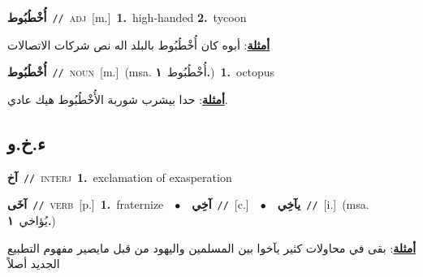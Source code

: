 \documentclass[10pt,a4paper,twoside]{article} %
\begin{document}
\begin{multicols}{2}
{\setlength\topsep{0pt}\textbf{\foreignlanguage{arabic}{أُخْطُبُوط}}\ {\color{gray}\texttt{//}\color{black}}\ \textsc{adj}\ [m.]\ \textbf{1.}~high-handed  \textbf{2.}~tycoon\  \begin{flushright}\color{gray}\foreignlanguage{arabic}{\textbf{\underline{\foreignlanguage{arabic}{أمثلة}}}: أبوه كان أُخْطُبُوط بالبلد اله نص شركات الاتصالات}\end{flushright}\color{black}} \vspace{2mm}

{\setlength\topsep{0pt}\textbf{\foreignlanguage{arabic}{أُخْطُبُوط}}\ {\color{gray}\texttt{//}\color{black}}\ \textsc{noun}\ [m.]\ \color{gray}(msa. \foreignlanguage{arabic}{أُخْطُبُوط}~\foreignlanguage{arabic}{\textbf{١.}})\color{black}\ \textbf{1.}~octopus\  \begin{flushright}\color{gray}\foreignlanguage{arabic}{\textbf{\underline{\foreignlanguage{arabic}{أمثلة}}}: حدا بيشرب شوربة الأُخْطُبُوط هيك عادي.}\end{flushright}\color{black}} \vspace{2mm}

\vspace{-3mm}
\subsection*{\color{blue}\foreignlanguage{arabic}{ء.خ.و}\color{blue}{}} 

{\setlength\topsep{0pt}\textbf{\foreignlanguage{arabic}{آخ}}\ {\color{gray}\texttt{//}\color{black}}\ \textsc{interj}\ \textbf{1.}~exclamation of exasperation\ } \vspace{2mm}

{\setlength\topsep{0pt}\textbf{\foreignlanguage{arabic}{آخَى}}\ {\color{gray}\texttt{//}\color{black}}\ \textsc{verb}\ [p.]\ \textbf{1.}~fraternize\ \ $\bullet$\ \ \setlength\topsep{0pt}\textbf{\foreignlanguage{arabic}{آخِي}}\ {\color{gray}\texttt{//}\color{black}}\ [c.]\ \ $\bullet$\ \ \setlength\topsep{0pt}\textbf{\foreignlanguage{arabic}{يآخِي}}\ {\color{gray}\texttt{//}\color{black}}\ [i.]\ \color{gray}(msa. \foreignlanguage{arabic}{يُؤاخي}~\foreignlanguage{arabic}{\textbf{١.}})\color{black}\  \begin{flushright}\color{gray}\foreignlanguage{arabic}{\textbf{\underline{\foreignlanguage{arabic}{أمثلة}}}: بقى في محاولات كثير يآخوا بين المسلمين واليهود من قبل مايصير مفهوم التطبيع الجديد أصلاً}\end{flushright}\color{black}} \vspace{2mm}


\end{multicols}
\end{document}
